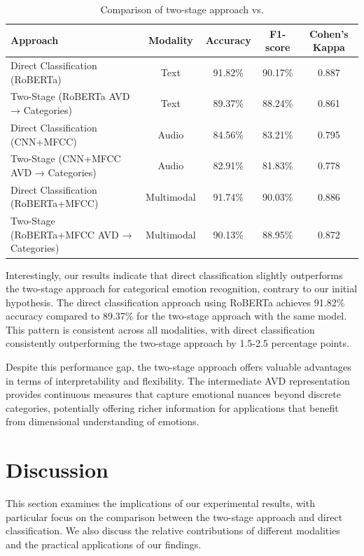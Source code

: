 \documentclass[12pt]{article}
\begin{document}
\begin{table}[h]
\centering
\caption{Comparison of two-stage approach vs.}
\label{tab:categorical_mapping}
\begin{tabular}{|l|c|c|c|c|}
\hline
\textbf{Approach} & \textbf{Modality} & \textbf{Accuracy} & \textbf{F1-score} & \textbf{Cohen's Kappa} \\
\hline
Direct Classification (RoBERTa) & Text & 91.82\% & 90.17\% & 0.887 \\
\hline
Two-Stage (RoBERTa AVD → Categories) & Text & 89.37\% & 88.24\% & 0.861 \\
\hline
Direct Classification (CNN+MFCC) & Audio & 84.56\% & 83.21\% & 0.795 \\
\hline
Two-Stage (CNN+MFCC AVD → Categories) & Audio & 82.91\% & 81.83\% & 0.778 \\
\hline
Direct Classification (RoBERTa+MFCC) & Multimodal & 91.74\% & 90.03\% & 0.886 \\
\hline
Two-Stage (RoBERTa+MFCC AVD → Categories) & Multimodal & 90.13\% & 88.95\% & 0.872 \\
\hline
\end{tabular}
\end{table}

Interestingly, our results indicate that direct classification slightly outperforms the two-stage approach for categorical emotion recognition, contrary to our initial hypothesis. The direct classification approach using RoBERTa achieves 91.82\% accuracy compared to 89.37\% for the two-stage approach with the same model. This pattern is consistent across all modalities, with direct classification consistently outperforming the two-stage approach by 1.5-2.5 percentage points.

Despite this performance gap, the two-stage approach offers valuable advantages in terms of interpretability and flexibility. The intermediate AVD representation provides continuous measures that capture emotional nuances beyond discrete categories, potentially offering richer information for applications that benefit from dimensional understanding of emotions.\section{Discussion}
\label{sec:discussion}

This section examines the implications of our experimental results, with particular focus on the comparison between the two-stage approach and direct classification. We also discuss the relative contributions of different modalities and the practical applications of our findings.
\end{document}
